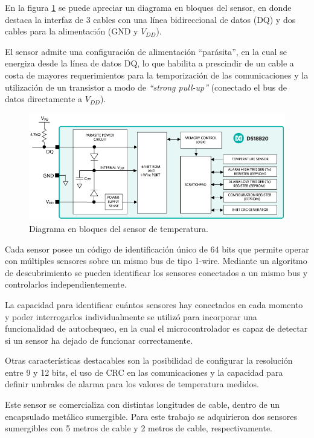 En la figura \ref{fig:ds18b20_bloques} se puede apreciar un diagrama en bloques del sensor, en donde destaca la interfaz de 3 cables con una línea bidireccional de datos (DQ) y dos cables para la alimentación (GND y $V_{DD}$). 

El sensor admite una configuración de alimentación ``parásita'', en la cual se energiza desde la línea de datos DQ, lo que habilita a prescindir de un cable a costa de mayores requerimientos para la temporización de las comunicaciones y la utilización de un transistor a modo de \textit{``strong pull-up''} (conectado el bus de datos directamente a $V_{DD}$).

\begin{figure}[htpb]
	\centering
	\includegraphics[width=.8\textwidth]{./Figures/ds18b20_bloques.png}
	\caption[Diagrama en bloques del sensor de temperatura DS18B20]{Diagrama en bloques del sensor de temperatura\protect\footnotemark.}
	\label{fig:ds18b20_bloques}
\end{figure}


Cada sensor posee un código de identificación único de 64 bits que permite operar con múltiples sensores sobre un mismo bus de tipo 1-wire.  Mediante un algoritmo de descubrimiento se pueden identificar los sensores conectados a un mismo bus y controlarlos independientemente. 

La capacidad para identificar cuántos sensores hay conectados en cada momento y poder interrogarlos individualmente se utilizó para incorporar una funcionalidad de autochequeo, en la cual el microcontrolador es capaz de detectar si un sensor ha dejado de funcionar correctamente.

Otras características destacables son la posibilidad de configurar la resolución entre 9 y 12 bits, el uso de CRC en las comunicaciones y la capacidad para definir umbrales de alarma para los valores de temperatura medidos.

Este sensor se comercializa con distintas longitudes de cable, dentro de un encapsulado metálico sumergible.  Para este trabajo se adquirieron dos sensores sumergibles con 5 metros de cable y 2 metros de cable, respectivamente.   


